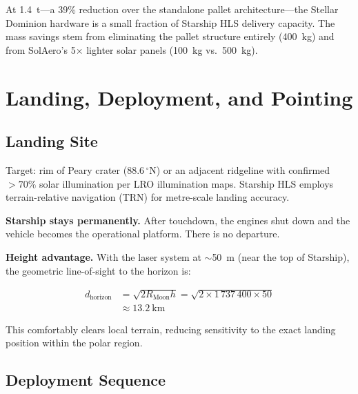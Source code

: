 \documentclass[10pt,letterpaper]{article}
\begin{document}
\noindent At \SI{1.4}{\tonne}---a 39\% reduction over the standalone pallet
architecture---the Stellar Dominion hardware is a small fraction of Starship
HLS delivery capacity. The mass savings stem from eliminating the pallet
structure entirely (\SI{400}{\kilo\gram}) and from SolAero's 5$\times$
lighter solar panels (\SI{100}{\kilo\gram} vs.\ \SI{500}{\kilo\gram}).

\section{Landing, Deployment, and Pointing}

\subsection{Landing Site}

Target: rim of Peary crater ($88.6\,^\circ$N) or an adjacent ridgeline with
confirmed $>70\%$ solar illumination per LRO illumination maps. Starship HLS
employs terrain-relative navigation (TRN) for metre-scale landing accuracy.

\textbf{Starship stays permanently.} After touchdown, the engines shut down
and the vehicle becomes the operational platform. There is no departure.

\textbf{Height advantage.} With the laser system at $\sim$\SI{50}{\meter}
(near the top of Starship), the geometric line-of-sight to the horizon is:

\begin{align*}
  d_{\text{horizon}} &= \sqrt{2 R_{\text{Moon}} h}
    = \sqrt{2 \times 1\,737\,400 \times 50} \\
    &\approx \SI{13.2}{\kilo\meter}
\end{align*}

This comfortably clears local terrain, reducing sensitivity to the exact
landing position within the polar region.

\subsection{Deployment Sequence}
\end{document}
